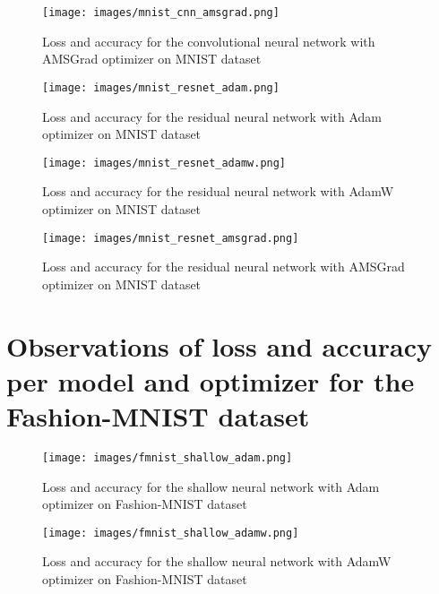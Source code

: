 \documentclass{article} %
\begin{document}
\begin{figure}[h]
\begin{center}
\texttt{[image: images/mnist\_cnn\_amsgrad.png]}
\end{center}
\caption{Loss and accuracy for the convolutional neural network with AMSGrad optimizer on MNIST dataset}
\end{figure}

\begin{figure}[h]
\begin{center}
\texttt{[image: images/mnist\_resnet\_adam.png]}
\end{center}
\caption{Loss and accuracy for the residual neural network with Adam optimizer on MNIST dataset}
\end{figure}

\begin{figure}[h]
\begin{center}
\texttt{[image: images/mnist\_resnet\_adamw.png]}
\end{center}
\caption{Loss and accuracy for the residual neural network with AdamW optimizer on MNIST dataset}
\end{figure}

\begin{figure}[h]
\begin{center}
\texttt{[image: images/mnist\_resnet\_amsgrad.png]}
\end{center}
\caption{Loss and accuracy for the residual neural network with AMSGrad optimizer on MNIST dataset}
\end{figure}

\clearpage
\section{Observations of loss and accuracy per model and optimizer for the Fashion-MNIST dataset}

\begin{figure}[h]
\begin{center}
\texttt{[image: images/fmnist\_shallow\_adam.png]}
\end{center}
\caption{Loss and accuracy for the shallow neural network with Adam optimizer on Fashion-MNIST dataset}
\end{figure}

\begin{figure}[h]
\begin{center}
\texttt{[image: images/fmnist\_shallow\_adamw.png]}
\end{center}
\caption{Loss and accuracy for the shallow neural network with AdamW optimizer on Fashion-MNIST dataset}
\end{figure}
\end{document}
